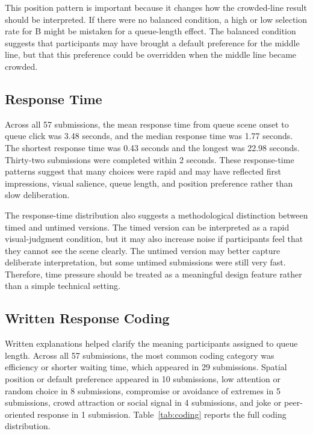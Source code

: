 \documentclass[stu,12pt,floatsintext]{apa7}
\begin{document}
This position pattern is important because it changes how the crowded-line result should be interpreted. If there were no balanced condition, a high or low selection rate for B might be mistaken for a queue-length effect. The balanced condition suggests that participants may have brought a default preference for the middle line, but that this preference could be overridden when the middle line became crowded.

\subsection{Response Time}

Across all 57 submissions, the mean response time from queue scene onset to queue click was 3.48 seconds, and the median response time was 1.77 seconds. The shortest response time was 0.43 seconds and the longest was 22.98 seconds. Thirty-two submissions were completed within 2 seconds. These response-time patterns suggest that many choices were rapid and may have reflected first impressions, visual salience, queue length, and position preference rather than slow deliberation.

The response-time distribution also suggests a methodological distinction between timed and untimed versions. The timed version can be interpreted as a rapid visual-judgment condition, but it may also increase noise if participants feel that they cannot see the scene clearly. The untimed version may better capture deliberate interpretation, but some untimed submissions were still very fast. Therefore, time pressure should be treated as a meaningful design feature rather than a simple technical setting.

\subsection{Written Response Coding}

Written explanations helped clarify the meaning participants assigned to queue length. Across all 57 submissions, the most common coding category was efficiency or shorter waiting time, which appeared in 29 submissions. Spatial position or default preference appeared in 10 submissions, low attention or random choice in 8 submissions, compromise or avoidance of extremes in 5 submissions, crowd attraction or social signal in 4 submissions, and joke or peer-oriented response in 1 submission. Table~\ref{tab:coding} reports the full coding distribution.
\end{document}
